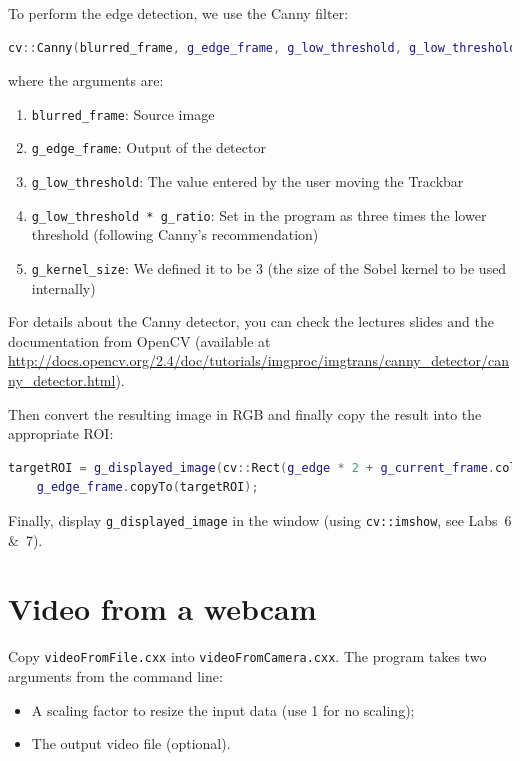 \documentclass[english,a4paper,12pt,oneside]{article}
\begin{document}
To perform the edge detection, we use the Canny filter:
\begin{lstlisting}[language=c++]
cv::Canny(blurred_frame, g_edge_frame, g_low_threshold, g_low_threshold * g_ratio, g_kernel_size);
\end{lstlisting}
where the arguments are:
\begin{enumerate}
    \item \verb+blurred_frame+: Source image
    \item \verb+g_edge_frame+: Output of the detector
    \item \verb+g_low_threshold+: The value entered by the user moving the Trackbar
    \item \verb+g_low_threshold * g_ratio+: Set in the program as three times the lower threshold (following Canny's recommendation)
    \item \verb+g_kernel_size+: We defined it to be 3 (the size of the Sobel kernel to be used internally)
\end{enumerate}
For details about the Canny detector, you can check the lectures slides and the documentation from OpenCV (available at \url{http://docs.opencv.org/2.4/doc/tutorials/imgproc/imgtrans/canny_detector/canny_detector.html}).

Then convert the resulting image in RGB and finally copy the result into the appropriate ROI:
\begin{lstlisting}[language=c++]
targetROI = g_displayed_image(cv::Rect(g_edge * 2 + g_current_frame.cols, g_edge, g_edge_frame.cols, g_edge_frame.rows));
    g_edge_frame.copyTo(targetROI);
\end{lstlisting}

Finally, display \verb+g_displayed_image+ in the window (using \verb=cv::imshow=, see Labs~6 \&~7).



\section{Video from a webcam}

Copy \verb+videoFromFile.cxx+ into \verb+videoFromCamera.cxx+.
The program takes two arguments from the command line:
\begin{itemize}
  \item A scaling factor to resize the input data (use 1 for no scaling);
  \item The output video file (optional).
\end{itemize}
\end{document}
